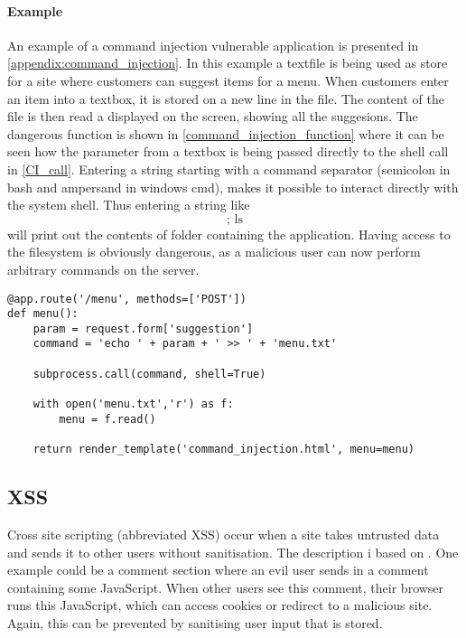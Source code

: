 \paragraph{Example}
An example of a command injection vulnerable application is presented in \cref{appendix:command_injection}.
In this example a textfile is being used as store for a site where customers can suggest items for a menu.
When customers enter an item into a textbox, it is stored on a new line in the file.
The content of the file is then read a displayed on the screen, showing all the suggesions.
The dangerous function is shown in \cref{command_injection_function} where it can be seen how the parameter from a textbox is being passed directly to the shell call in \cref{CI_call}.
Entering a string starting with a command separator (semicolon in bash and ampersand in windows cmd), makes it possible to interact directly with the system shell.
Thus entering a string like
\[ \text{; ls} \]
will print out the contents of folder containing the application.
Having access to the filesystem is obviously dangerous, as a malicious user can now perform arbitrary commands on the server.

\begin{lstlisting}[style=python, caption={The culprit making command injection possible. Param is not being escaped before being executed by the shell.}, label={command_injection_function}, firstnumber=13]
@app.route('/menu', methods=['POST'])
def menu():
    param = request.form['suggestion']
    command = 'echo ' + param + ' >> ' + 'menu.txt'

    subprocess.call(command, shell=True)

    with open('menu.txt','r') as f:
        menu = f.read()

    return render_template('command_injection.html', menu=menu)

\end{lstlisting}

\subsection{XSS}\label{vulnerabilities:xss}
Cross site scripting (abbreviated XSS) occur when a site takes untrusted data and sends it to other users without sanitisation.
The description i based on \citet{crosssitescripting}.
One example could be a comment section where an evil user sends in a comment containing some JavaScript.
When other users see this comment, their browser runs this JavaScript, which can access cookies or redirect to a malicious site.
Again, this can be prevented by sanitising user input that is stored.

